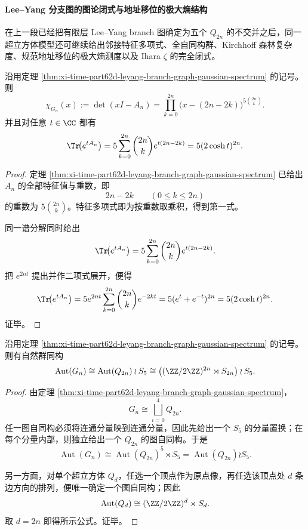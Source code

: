 \paragraph{Lee--Yang 分支图的图论闭式与地址移位的极大熵结构}
在上一段已经把有限层 Lee--Yang branch 图确定为五个 \(Q_{2n}\) 的不交并之后，同一超立方体模型还可继续给出邻接特征多项式、全自同构群、Kirchhoff 森林复杂度、规范地址移位的极大熵测度以及 Ihara \(\zeta\) 的完全闭式。

\begin{theorem}\label{thm:xi-time-part62d-leyang-branch-adjacency-charpoly-heat}
沿用定理 \ref{thm:xi-time-part62d-leyang-branch-graph-gaussian-spectrum} 的记号。则
\[
\chi_{G_n}(x):=\det(xI-A_n)
=
\prod_{k=0}^{2n}\bigl(x-(2n-2k)\bigr)^{5\binom{2n}{k}}.
\]
并且对任意 \(t\in\CC\) 都有
\[
\Tr\!\bigl(e^{tA_n}\bigr)
=
5\sum_{k=0}^{2n}\binom{2n}{k}e^{t(2n-2k)}
=
5(2\cosh t)^{2n}.
\]
\end{theorem}
\begin{proof}
定理 \ref{thm:xi-time-part62d-leyang-branch-graph-gaussian-spectrum} 已给出 \(A_n\) 的全部特征值与重数，即
\[
2n-2k
\qquad(0\le k\le 2n)
\]
的重数为 \(5\binom{2n}{k}\)。特征多项式即为按重数取乘积，得到第一式。

同一谱分解同时给出
\[
\Tr\!\bigl(e^{tA_n}\bigr)
=
5\sum_{k=0}^{2n}\binom{2n}{k}e^{t(2n-2k)}.
\]
把 \(e^{2nt}\) 提出并作二项式展开，便得
\[
\Tr\!\bigl(e^{tA_n}\bigr)
=
5e^{2nt}\sum_{k=0}^{2n}\binom{2n}{k}e^{-2kt}
=
5(e^t+e^{-t})^{2n}
=
5(2\cosh t)^{2n}.
\]
证毕。
\end{proof}

\begin{theorem}\label{thm:xi-time-part62d-leyang-branch-graph-automorphism-wreath}
沿用定理 \ref{thm:xi-time-part62d-leyang-branch-graph-gaussian-spectrum} 的记号。则有自然群同构
\[
\operatorname{Aut}(G_n)
\cong
\operatorname{Aut}(Q_{2n})\wr S_5
\cong
\bigl((\ZZ/2\ZZ)^{2n}\rtimes S_{2n}\bigr)\wr S_5.
\]
\end{theorem}
\begin{proof}
由定理 \ref{thm:xi-time-part62d-leyang-branch-graph-gaussian-spectrum}，
\[
G_n\cong \bigsqcup_{i=0}^{4}Q_{2n}.
\]
任一图自同构必须将连通分量映到连通分量，因此先给出一个 \(S_5\) 的分量置换；在每个分量内部，则独立给出一个 \(Q_{2n}\) 的图自同构。于是
\[
\operatorname{Aut}(G_n)\cong \operatorname{Aut}(Q_{2n})^5\rtimes S_5
=
\operatorname{Aut}(Q_{2n})\wr S_5.
\]

另一方面，对单个超立方体 \(Q_d\)，任选一个顶点作为原点像，再任选该顶点处 \(d\) 条边方向的排列，便唯一确定一个图自同构；因此
\[
\operatorname{Aut}(Q_d)\cong (\ZZ/2\ZZ)^d\rtimes S_d.
\]
取 \(d=2n\) 即得所示公式。证毕。
\end{proof}

